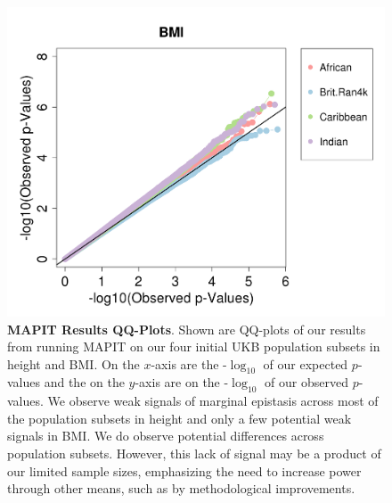 \documentclass[12pt, a4paper]{article}
\begin{document}
\begin{figure}[htbp]
\centering
\includegraphics[scale=.35]{Images/Supp/InterPath_Supp_Figure_MAPIT_vs3_BMI.png}
\caption[TBD]{\textbf{MAPIT Results QQ-Plots}. Shown are QQ-plots of our results from running MAPIT on our four initial UKB population subsets in height and BMI. On the $x$-axis are the -$\log_{10}$ of our expected $p$-values and the on the $y$-axis are on the -$\log_{10}$ of our observed $p$-values. We observe weak signals of marginal epistasis across most of the population subsets in height and only a few potential weak signals in BMI. We do observe potential differences across population subsets. However, this lack of signal may be a product of our limited sample sizes, emphasizing the need to increase power through other means, such as by methodological improvements.}
\label{InterPath-Supp-Figure-MAPIT-BMI}
\end{figure}
\end{document}
